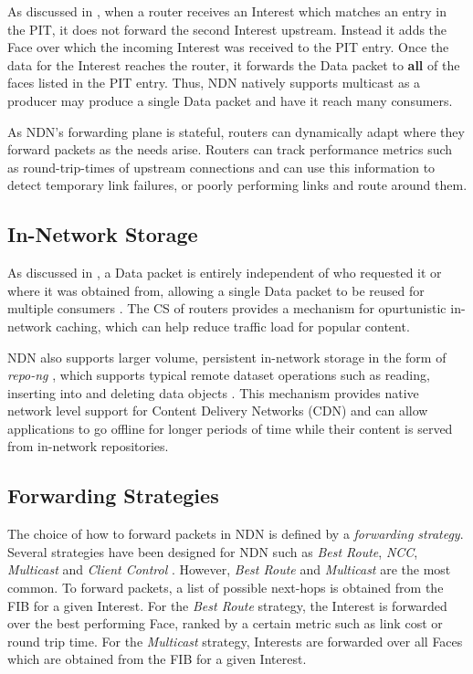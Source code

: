 As discussed in , when a router receives an Interest which matches an entry in the PIT, it does not forward the second Interest upstream. Instead it adds the Face over which the incoming Interest was received to the PIT entry. Once the data for the Interest reaches the router, it forwards the Data packet to \textbf{all} of the faces listed in the PIT entry. Thus, NDN natively supports multicast as a producer may produce a single Data packet and have it reach many consumers. 

As NDN's forwarding plane is stateful, routers can dynamically adapt where they forward packets as the needs arise. Routers can track performance metrics such as round-trip-times of upstream connections and can use this information to detect temporary link failures, or poorly performing links and route around them.

\subsection{In-Network Storage}
As discussed in , a Data packet is entirely independent of who requested it or where it was obtained from, allowing a single Data packet to be reused for multiple consumers \cite{ndn}. The CS of routers provides a mechanism for opurtunistic in-network caching, which can help reduce traffic load for popular content. 

NDN also supports larger volume, persistent in-network storage in the form of \textit{repo-ng} \cite{ndn-repo}, which supports typical remote dataset operations such as reading, inserting into and deleting data objects \cite{ndn-repo-homepage}. This mechanism provides native network level support for Content Delivery Networks (CDN) \cite{ndn} and can allow applications to go offline for longer periods of 
time while their content is served from in-network repositories.

\subsection{Forwarding Strategies}
The choice of how to forward packets in NDN is defined by a \textit{forwarding strategy}. Several strategies have been designed for NDN such as \textit{Best Route}, \textit{NCC}, \textit{Multicast} and \textit{Client Control} \cite{ndn-sim-forwarding-strategies}. However, \textit{Best Route} and \textit{Multicast} are the most common. To forward packets, a list of possible next-hops is obtained from the FIB for a given Interest. For the \textit{Best Route} strategy, the Interest is forwarded over the best performing Face, ranked by a certain metric such as link cost or round trip time. For the \textit{Multicast} strategy, Interests are forwarded over all Faces which are obtained from the FIB for a given Interest.

